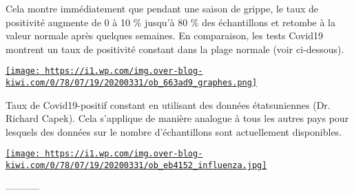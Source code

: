 Cela montre immédiatement que pendant une saison de grippe, le taux de
positivité augmente de 0 à 10 \% jusqu'à 80 \% des échantillons et
retombe à la valeur normale après quelques semaines. En comparaison, les
tests Covid19 montrent un taux de positivité constant dans la plage
normale (voir ci-dessous).

\href{http://img.over-blog-kiwi.com/0/78/07/19/20200331/ob_663ad9_graphes.png\#width=847\&height=690}{\texttt{[image: https://i1.wp.com/img.over-blog-kiwi.com/0/78/07/19/20200331/ob\_663ad9\_graphes.png]}}

Taux de Covid19-positif constant en utilisant des données étatsuniennes
(Dr. Richard Capek). Cela s'applique de manière analogue à tous les
autres pays pour lesquels des données sur le nombre d'échantillons sont
actuellement disponibles.

\href{http://img.over-blog-kiwi.com/0/78/07/19/20200331/ob_eb4152_influenza.jpg\#width=600\&height=325}{\texttt{[image: https://i1.wp.com/img.over-blog-kiwi.com/0/78/07/19/20200331/ob\_eb4152\_influenza.jpg]}}

-----------

